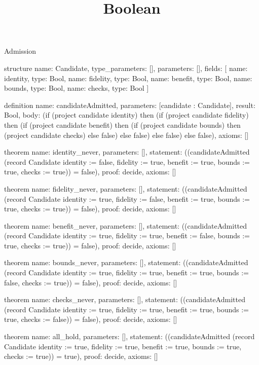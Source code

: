 \begin{lexlean}{Admission}
\title{Boolean}
\begin{semanticmodule}
structure{
  name: Candidate,
  type_parameters: [],
  parameters: [],
  fields: [
    {name: identity, type: Bool},
    {name: fidelity, type: Bool},
    {name: benefit, type: Bool},
    {name: bounds, type: Bool},
    {name: checks, type: Bool}
  ]
}

definition{
  name: candidateAdmitted,
  parameters: [candidate : Candidate],
  result: Bool,
  body: (if (project candidate identity) then
    (if (project candidate fidelity) then
      (if (project candidate benefit) then
        (if (project candidate bounds) then (project candidate checks) else false)
      else false)
    else false)
  else false),
  axioms: []
}

theorem{
  name: identity_never,
  parameters: [],
  statement: ((candidateAdmitted (record Candidate {identity := false, fidelity := true, benefit := true, bounds := true, checks := true})) = false),
  proof: decide{},
  axioms: []
}

theorem{
  name: fidelity_never,
  parameters: [],
  statement: ((candidateAdmitted (record Candidate {identity := true, fidelity := false, benefit := true, bounds := true, checks := true})) = false),
  proof: decide{},
  axioms: []
}

theorem{
  name: benefit_never,
  parameters: [],
  statement: ((candidateAdmitted (record Candidate {identity := true, fidelity := true, benefit := false, bounds := true, checks := true})) = false),
  proof: decide{},
  axioms: []
}

theorem{
  name: bounds_never,
  parameters: [],
  statement: ((candidateAdmitted (record Candidate {identity := true, fidelity := true, benefit := true, bounds := false, checks := true})) = false),
  proof: decide{},
  axioms: []
}

theorem{
  name: checks_never,
  parameters: [],
  statement: ((candidateAdmitted (record Candidate {identity := true, fidelity := true, benefit := true, bounds := true, checks := false})) = false),
  proof: decide{},
  axioms: []
}

theorem{
  name: all_hold,
  parameters: [],
  statement: ((candidateAdmitted (record Candidate {identity := true, fidelity := true, benefit := true, bounds := true, checks := true})) = true),
  proof: decide{},
  axioms: []
}
\end{semanticmodule}
\end{lexlean}
